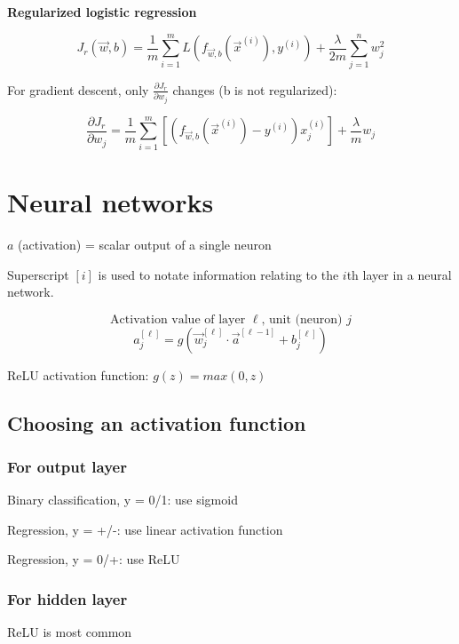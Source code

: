 \documentclass[12pt]{article}
\begin{document}
\noindent \textbf{Regularized logistic regression}

\[ J_r(\vec{w},b) = \frac{1}{m} \sum_{i=1}^m L(f_{\vec{w},b}(\vec{x}^{(i)}), y^{(i)}) + \frac{\lambda}{2m} \sum_{j=1}^n w_j^2 \]

For gradient descent, only $\frac{\partial J_r}{\partial w_j}$ changes (b is not regularized):

\[ \frac{\partial J_r}{\partial w_j} = \frac{1}{m} \sum_{i=1}^m \left[(f_{\vec{w},b}(\vec{x}^{(i)}) - y^{(i)})x_j^{(i)}\right] + \frac{\lambda}{m} w_j \]

\pagebreak

\section{Neural networks}

$a$ (activation) = scalar output of a single neuron

Superscript $[i]$ is used to notate information relating to the $i$th layer in a neural network.

\[ \text{Activation value of layer $\ell$, unit (neuron) $j$} \]
\[ a_j^{[\ell]} = g(\vec{w}_j^{[\ell]} \cdot \vec{a}^{[\ell - 1]} + b_j^{[\ell]}) \]

ReLU activation function: $g(z) = max(0, z)$

\subsection{Choosing an activation function}

\subsubsection*{For output layer}

Binary classification, y = 0/1: use sigmoid

Regression, y = +/-: use linear activation function

Regression, y = 0/+: use ReLU

\subsubsection*{For hidden layer}

ReLU is most common
\end{document}

